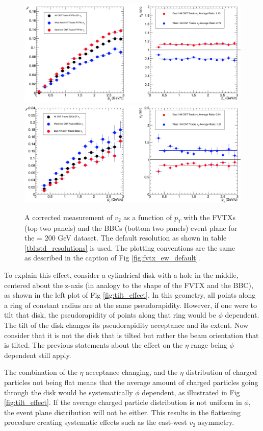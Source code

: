 \begin{figure}[!ht]
\begin{center}
\includegraphics[width=0.85\linewidth]{figs/fvtx_vertex_rot_only.png}
\includegraphics[width=0.85\linewidth]{figs/bbc_vertex_rot_only.png}
\caption{A corrected measurement of $v_{2}$ as a function of $p_T$ with the FVTXs (top two panels) and the BBCs (bottom two panels) event plane for the \pau \sqsn = 200 GeV dataset. The default resolution as shown in table \ref{tbl:std_resolutions} is used. The plotting conventions are the same as described in the caption of Fig \ref{fig:fvtx_ew_default}. }
\label{fig:fvtx_ew_rot}
\end{center}
\end{figure}

To explain this effect, consider a cylindrical disk with a hole in the middle, centered about the z-axis (in analogy to the shape of the FVTX and the BBC), as shown in the left plot of Fig \ref{fig:tilt_effect}. In this geometry, all points along a ring of constant radius are at the same pseudorapidity. However, if one were to tilt that disk, the pseudorapidity of points along that ring would be $\phi$ dependent. The tilt of the disk changes its pseudorapidity acceptance and its extent. Now consider that it is not the disk that is tilted but rather the beam orientation that is tilted. The previous statements about the effect on the $\eta$ range being $\phi$ dependent still apply. 

The combination of the $\eta$ acceptance changing, and the $\eta$ distribution of charged particles not being flat means that the average amount of charged particles going through the disk would be systematically $\phi$ dependent, as illustrated in Fig \ref{fig:tilt_effect}. If the average charged particle distribution is not uniform in $\phi$, the event plane distribution will not be either. This results in the flattening procedure creating systematic effects such as the east-west $v_2$ asymmetry.

